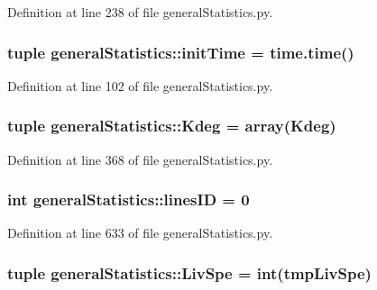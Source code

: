 \-Definition at line 238 of file general\-Statistics.\-py.

\hypertarget{namespacegeneral_statistics_aa46cfad394454af6b0edb80b804912c4}{
\subsubsection[{init\-Time}]{\setlength{\rightskip}{0pt plus 5cm}tuple {\bf general\-Statistics\-::init\-Time} = time.\-time()}}\label{namespacegeneral_statistics_aa46cfad394454af6b0edb80b804912c4}


\-Definition at line 102 of file general\-Statistics.\-py.

\hypertarget{namespacegeneral_statistics_ac869e7a93953327296c2c2840049f28b}{
\subsubsection[{\-Kdeg}]{\setlength{\rightskip}{0pt plus 5cm}tuple {\bf general\-Statistics\-::\-Kdeg} = array({\bf \-Kdeg})}}\label{namespacegeneral_statistics_ac869e7a93953327296c2c2840049f28b}


\-Definition at line 368 of file general\-Statistics.\-py.

\hypertarget{namespacegeneral_statistics_aabdf31c148d67f609f1ba9a84c9239a6}{
\subsubsection[{lines\-I\-D}]{\setlength{\rightskip}{0pt plus 5cm}int {\bf general\-Statistics\-::lines\-I\-D} = 0}}\label{namespacegeneral_statistics_aabdf31c148d67f609f1ba9a84c9239a6}


\-Definition at line 633 of file general\-Statistics.\-py.

\hypertarget{namespacegeneral_statistics_a3d0e4581ae576e909d1449f0fe6ce4ec}{
\subsubsection[{\-Liv\-Spe}]{\setlength{\rightskip}{0pt plus 5cm}tuple {\bf general\-Statistics\-::\-Liv\-Spe} = int(tmp\-Liv\-Spe)}}\label{namespacegeneral_statistics_a3d0e4581ae576e909d1449f0fe6ce4ec}


